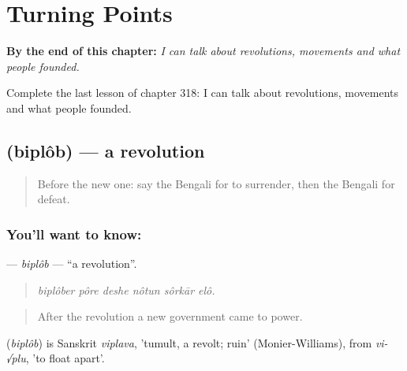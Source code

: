 
\chapter{Turning Points}
\label{ch:bn-turning-points}

\begin{chapteropening}
\textbf{By the end of this chapter:} \emph{I can talk about revolutions, movements and what people founded.}

Complete the last lesson of chapter 318: I can talk about revolutions, movements and what people founded.
\end{chapteropening}

\section[\texorpdfstring{\bn{বিপ্লব} (biplôb)}{বিপ্লব (biplôb)}]{ (biplôb) — a revolution}

\label{lesson:BN-C318-biplob}



\begin{quote}
Before the new one: say the Bengali for to surrender, then the Bengali for defeat.
\end{quote}

\subsection*{You'll want to know: }
\textbf{} — \emph{biplôb} — \textquotedblleft{}a revolution\textquotedblright{}.

\begin{quote}
     
\end{quote}

\begin{quote}
\emph{biplôber pôre deshe nôtun sôrkār elô.}
\end{quote}

\begin{quote}
After the revolution a new government came to power.
\end{quote}

\begin{cousinweb}
\textbf{} (\emph{biplôb}) is Sanskrit \emph{viplava}, 'tumult, a revolt; ruin' (Monier-Williams), from \emph{vi-√plu}, 'to float apart'.
\end{cousinweb}

